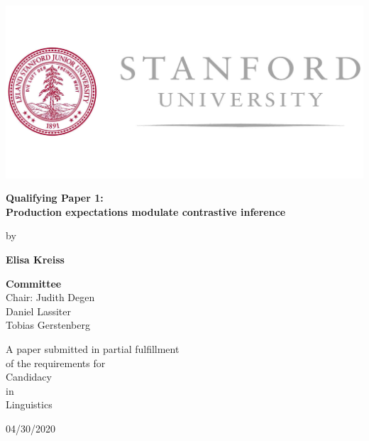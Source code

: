 \documentclass[a4paper]{article}
\begin{document}
	\begin{titlepage}
		\begin{center}
			\includegraphics[width=.8\textwidth]{../img/stanford_logo.jpg}
			
			\LARGE
			\textbf{Qualifying Paper 1:\\
			Production expectations modulate contrastive inference}
			
			\vspace{1cm}
			by
			
			\vspace{1cm}
			
			\textbf{Elisa Kreiss}
			
			\vspace{2cm}
			
			\large
			
			\textbf{Committee}\\
			Chair: Judith Degen\\
			Daniel Lassiter\\
			Tobias Gerstenberg\\
			
			\vfill

			A paper submitted in partial fulfillment\\
			of the requirements for\\
			Candidacy\\
			in\\
			Linguistics\\
			
			\vspace{0.8cm}
			
			04/30/2020\\
			
			\vspace{1cm}
			
			
		\end{center}
	\end{titlepage}
\end{document}
